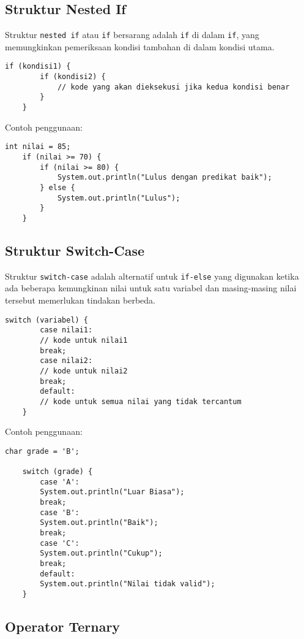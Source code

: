 \subsection{Struktur Nested If}

Struktur \texttt{nested if} atau \texttt{if} bersarang adalah \texttt{if} di dalam \texttt{if}, yang memungkinkan pemeriksaan kondisi tambahan di dalam kondisi utama.

\begin{lstlisting}[style=JavaStyle]
	if (kondisi1) {
		if (kondisi2) {
			// kode yang akan dieksekusi jika kedua kondisi benar
		}
	}
\end{lstlisting}

Contoh penggunaan:

\begin{lstlisting}[style=JavaStyle]
	int nilai = 85;
	if (nilai >= 70) {
		if (nilai >= 80) {
			System.out.println("Lulus dengan predikat baik");
		} else {
			System.out.println("Lulus");
		}
	}
\end{lstlisting}

\subsection{Struktur Switch-Case}

Struktur \texttt{switch-case} adalah alternatif untuk \texttt{if-else} yang digunakan ketika ada beberapa kemungkinan nilai untuk satu variabel dan masing-masing nilai tersebut memerlukan tindakan berbeda.

\begin{lstlisting}[style=JavaStyle]
	switch (variabel) {
		case nilai1:
		// kode untuk nilai1
		break;
		case nilai2:
		// kode untuk nilai2
		break;
		default:
		// kode untuk semua nilai yang tidak tercantum
	}
\end{lstlisting}

Contoh penggunaan:

\begin{lstlisting}[style=JavaStyle]
	char grade = 'B';
	
	switch (grade) {
		case 'A':
		System.out.println("Luar Biasa");
		break;
		case 'B':
		System.out.println("Baik");
		break;
		case 'C':
		System.out.println("Cukup");
		break;
		default:
		System.out.println("Nilai tidak valid");
	}
\end{lstlisting}

\subsection{Operator Ternary}


